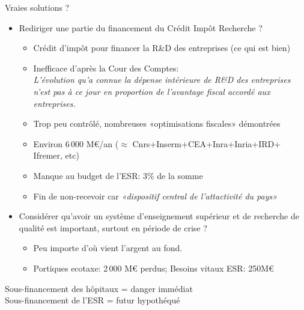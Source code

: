 \documentclass[10pt,final,usepdftitle=false]{beamer}
\begin{document}
\begin{frame}{Vraies solutions ?}
\begin{itemize}

\item Rediriger une partie du financement du Crédit Impôt Recherche ?
\begin{itemize}
\item Crédit d'impôt pour financer la R\&D des entreprises (ce qui est bien)
\item Inefficace d'après la Cour des Comptes:\\
  {\sl \og L’évolution qu’a connue la dépense intérieure de R\&D des entreprises
    n’est pas à ce jour en proportion de l’avantage fiscal accordé aux
    entreprises. \fg }
\item Trop peu contrôlé, nombreuses «optimisations fiscales» démontrées
\item Environ 6$\,$000 M\euro/an ($\approx$ Cnrs+Inserm+CEA+Inra+Inria+IRD+
  Ifremer, etc)
\item Manque au budget de l'ESR: 3\% de la somme
\item Fin de non-recevoir car \textit{«dispositif central de l'attactivité du
    pays»}
\end{itemize}
\pause \bigskip
\item Considérer qu'avoir un système d'enseignement supérieur et de recherche de
  qualité est important, surtout en période de crise ?
  \begin{itemize}
  \item Peu importe d'où vient l'argent au fond.
  \item Portiques ecotaxe: 2$\,$000 M\euro{} perdus; Besoins vitaux ESR:
    250M\euro
  \end{itemize}
\end{itemize}
\begin{center}
  Sous-financement des hôpitaux = danger immédiat\\
  Sous-financement de l'ESR = futur hypothéqué
\end{center}
\end{frame}
\end{document}
